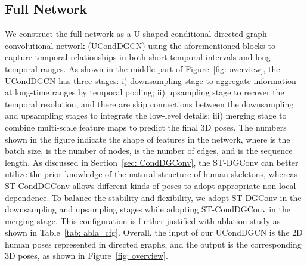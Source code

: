 \documentclass[sigconf]{acmart}
\begin{document}
\subsection{Full Network}
We construct the full network as a U-shaped conditional directed graph convolutional network (UCondDGCN) using the aforementioned blocks to capture temporal relationships in both short temporal intervals and long temporal ranges.
As shown in the middle part of Figure~\ref{fig: overview}, the UCondDGCN has three stages: i) downsampling stage to aggregate information at long-time ranges by temporal pooling; ii) upsampling stage to recover the temporal resolution, and there are skip connections between the downsampling and upsampling stages to integrate the low-level details; iii) merging stage to combine multi-scale feature maps to predict the final 3D poses.
The numbers shown in the figure indicate the shape of features in the network, where  is the batch size,  is the number of nodes,  is the number of edges, and  is the sequence length.
As discussed in Section~\ref{sec: CondDGConv}, the ST-DGConv can better utilize the prior knowledge of the natural structure of human skeletons, whereas ST-CondDGConv allows different kinds of poses to adopt appropriate non-local dependence.
To balance the stability and flexibility, we adopt ST-DGConv in the downsampling and upsampling stages while adopting ST-CondDGConv in the merging stage.
This configuration is further justified with ablation study as shown in Table~\ref{tab: abla_cfg}.
Overall, the input of our UCondDGCN is the 2D human poses represented in directed graphs, and the output is the corresponding 3D poses, as shown in Figure~\ref{fig: overview}.
\end{document}
